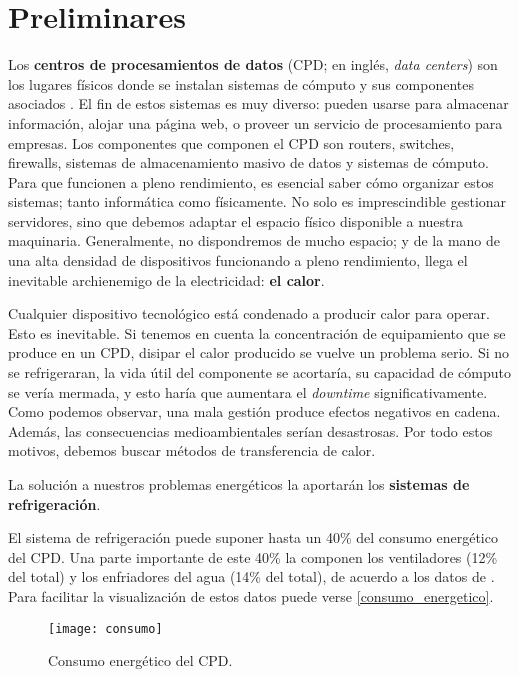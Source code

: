 \chapter{Preliminares}

Los \textbf{centros de procesamientos de datos} (CPD; en inglés, \textit{data centers}) son los lugares físicos donde se instalan sistemas de cómputo y sus componentes asociados \cite{wikipedia-datacenter}. El fin de estos sistemas es muy diverso: pueden usarse para almacenar información, alojar una página web, o proveer un servicio de procesamiento para empresas. Los componentes que componen el CPD son routers, switches, firewalls, sistemas de almacenamiento masivo de datos y sistemas de cómputo. Para que funcionen a pleno rendimiento, es esencial saber cómo organizar estos sistemas; tanto informática como físicamente. No solo es imprescindible gestionar servidores, sino que debemos adaptar el espacio físico disponible a nuestra maquinaria. Generalmente, no dispondremos de mucho espacio; y de la mano de una alta densidad de dispositivos funcionando a pleno rendimiento, llega el inevitable archienemigo de la electricidad: \textbf{el calor}.

Cualquier dispositivo tecnológico está condenado a producir calor para operar. Esto es inevitable. Si tenemos en cuenta la concentración de equipamiento que se produce en un CPD, disipar el calor producido se vuelve un problema serio. Si no se refrigeraran, la vida útil del componente se acortaría, su capacidad de cómputo se vería mermada, y esto haría que aumentara el \textit{downtime} significativamente. Como podemos observar, una mala gestión produce efectos negativos en cadena. Además, las consecuencias medioambientales serían desastrosas. Por todo estos motivos, debemos buscar métodos de transferencia de calor.

La solución a nuestros problemas energéticos la aportarán los \textbf{sistemas de refrigeración}.

El sistema de refrigeración puede suponer hasta un 40\% del consumo energético del CPD. Una parte importante de este 40\% la componen los ventiladores (12\% del total) y los enfriadores del agua (14\% del total), de acuerdo a los datos de \cite{ZHANG2021102253}. Para facilitar la visualización de estos datos puede verse \eqref{consumo_energetico}.

\begin{figure}
    \begin{center}
        \label{consumo_energetico}
        \texttt{[image: consumo]}
        \caption{Consumo energético del CPD.}
    \end{center}
\end{figure}

